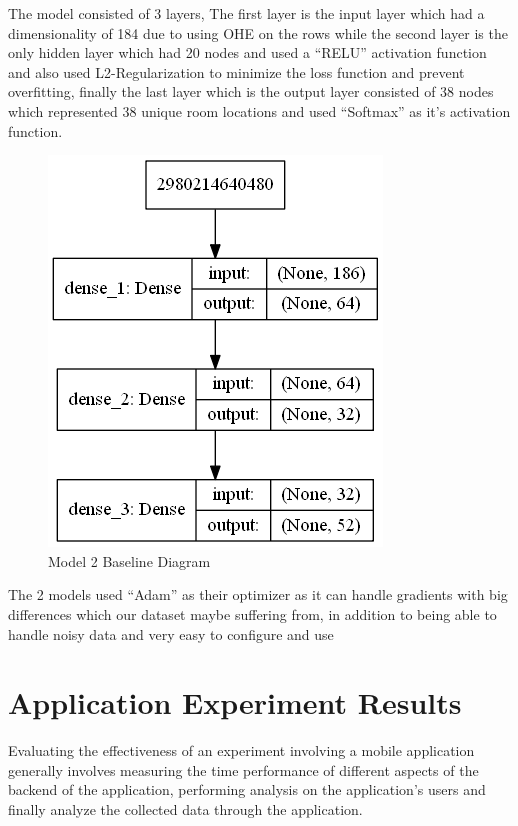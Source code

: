 The model consisted of 3 layers, The first layer is the input layer which had a dimensionality of 184 due to using OHE on the rows while the second layer is the only hidden layer which had 20 nodes and used a “RELU” activation function and also used L2-Regularization to minimize the loss function and prevent overfitting, finally the last
layer which is the output layer consisted of 38 nodes which represented 38 unique room locations and used “Softmax” as it's activation function.\par
\begin{figure}[H]
    \centering
    \includegraphics[scale=0.65]{model3}
    \caption{Model 2 Baseline Diagram}
    \label{fig:Model2}
  \end{figure}
The 2 models used “Adam” as their optimizer as it can handle gradients with big differences which our dataset maybe suffering from, in addition to being able to handle noisy data and very easy to configure and use



\section{Application Experiment Results}
\label{sec:expres}
Evaluating the effectiveness of an experiment involving a mobile application generally involves measuring the time performance of different aspects of the backend of the application, performing analysis on the application's users and finally analyze the collected data through the application.
